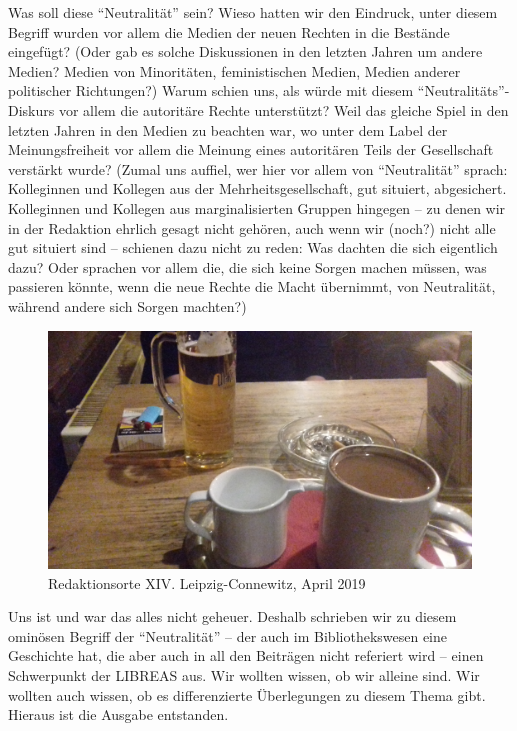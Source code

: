 \documentclass[a4paper,
fontsize=11pt,
oneside,
numbers=noperiodatend,
parskip=half-,
bibliography=totoc,
final
]{scrartcl}
\begin{document}
Was soll diese \enquote{Neutralität} sein? Wieso hatten wir den
Eindruck, unter diesem Begriff wurden vor allem die Medien der neuen
Rechten in die Bestände eingefügt? (Oder gab es solche Diskussionen in
den letzten Jahren um andere Medien? Medien von Minoritäten,
feministischen Medien, Medien anderer politischer Richtungen?) Warum
schien uns, als würde mit diesem \enquote{Neutralitäts}-Diskurs vor
allem die autoritäre Rechte unterstützt? Weil das gleiche Spiel in den
letzten Jahren in den Medien zu beachten war, wo unter dem Label der
Meinungsfreiheit vor allem die Meinung eines autoritären Teils der
Gesellschaft verstärkt wurde? (Zumal uns auffiel, wer hier vor allem von
\enquote{Neutralität} sprach: Kolleginnen und Kollegen aus der
Mehrheitsgesellschaft, gut situiert, abgesichert. Kolleginnen und
Kollegen aus marginalisierten Gruppen hingegen -- zu denen wir in der
Redaktion ehrlich gesagt nicht gehören, auch wenn wir (noch?) nicht alle
gut situiert sind -- schienen dazu nicht zu reden: Was dachten die sich
eigentlich dazu? Oder sprachen vor allem die, die sich keine Sorgen
machen müssen, was passieren könnte, wenn die neue Rechte die Macht
übernimmt, von Neutralität, während andere sich Sorgen machten?)

\begin{figure}[h!]
\centering
\includegraphics{img/abb.jpg}
\caption{Redaktionsorte XIV. Leipzig-Connewitz, April 2019}
\end{figure}

Uns ist und war das alles nicht geheuer. Deshalb schrieben wir zu diesem
ominösen Begriff der \enquote{Neutralität} -- der auch im
Bibliothekswesen eine Geschichte hat, die aber auch in all den Beiträgen
nicht referiert wird -- einen Schwerpunkt der LIBREAS aus. Wir wollten
wissen, ob wir alleine sind. Wir wollten auch wissen, ob es
differenzierte Überlegungen zu diesem Thema gibt. Hieraus ist die
Ausgabe entstanden.
\end{document}
